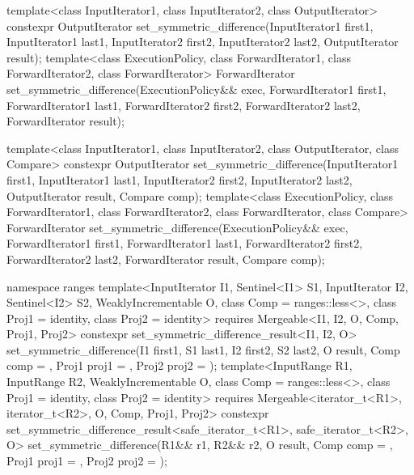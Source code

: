 %
\begin{itemdecl}
template<class InputIterator1, class InputIterator2,
         class OutputIterator>
  constexpr OutputIterator
    set_symmetric_difference(InputIterator1 first1, InputIterator1 last1,
                             InputIterator2 first2, InputIterator2 last2,
                             OutputIterator result);
template<class ExecutionPolicy, class ForwardIterator1, class ForwardIterator2,
         class ForwardIterator>
  ForwardIterator
    set_symmetric_difference(ExecutionPolicy&& exec,
                             ForwardIterator1 first1, ForwardIterator1 last1,
                             ForwardIterator2 first2, ForwardIterator2 last2,
                             ForwardIterator result);

template<class InputIterator1, class InputIterator2,
         class OutputIterator, class Compare>
  constexpr OutputIterator
    set_symmetric_difference(InputIterator1 first1, InputIterator1 last1,
                             InputIterator2 first2, InputIterator2 last2,
                             OutputIterator result, Compare comp);
template<class ExecutionPolicy, class ForwardIterator1, class ForwardIterator2,
         class ForwardIterator, class Compare>
  ForwardIterator
    set_symmetric_difference(ExecutionPolicy&& exec,
                             ForwardIterator1 first1, ForwardIterator1 last1,
                             ForwardIterator2 first2, ForwardIterator2 last2,
                             ForwardIterator result, Compare comp);

namespace ranges {
  template<InputIterator I1, Sentinel<I1> S1, InputIterator I2, Sentinel<I2> S2,
           WeaklyIncrementable O, class Comp = ranges::less<>,
           class Proj1 = identity, class Proj2 = identity>
    requires Mergeable<I1, I2, O, Comp, Proj1, Proj2>
    constexpr set_symmetric_difference_result<I1, I2, O>
      set_symmetric_difference(I1 first1, S1 last1, I2 first2, S2 last2, O result,
                               Comp comp = {}, Proj1 proj1 = {},
                               Proj2 proj2 = {});
  template<InputRange R1, InputRange R2, WeaklyIncrementable O,
           class Comp = ranges::less<>, class Proj1 = identity, class Proj2 = identity>
    requires Mergeable<iterator_t<R1>, iterator_t<R2>, O, Comp, Proj1, Proj2>
    constexpr set_symmetric_difference_result<safe_iterator_t<R1>, safe_iterator_t<R2>, O>
      set_symmetric_difference(R1&& r1, R2&& r2, O result, Comp comp = {},
                               Proj1 proj1 = {}, Proj2 proj2 = {});
}
\end{itemdecl}

